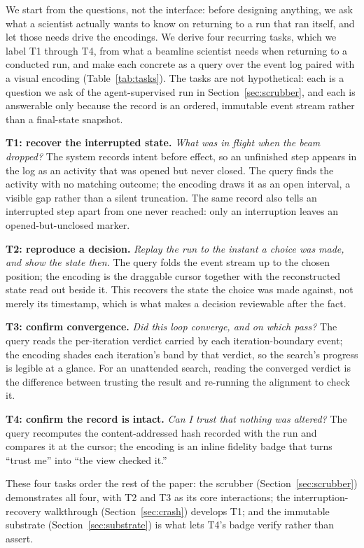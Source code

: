 
We start from the questions, not the interface: before designing anything, we
ask what a scientist actually wants to know on returning to a run that ran
itself, and let those needs drive the encodings. We derive four recurring tasks,
which we label T1 through T4, from what a beamline scientist needs when returning
to a conducted run, and make each concrete as a query over the event log paired
with a visual encoding (Table~\ref{tab:tasks}). The tasks are
not hypothetical: each is a question we ask of the agent-supervised
run in Section~\ref{sec:scrubber}, and each is answerable only because the record is
an ordered, immutable event stream rather than a final-state snapshot.

\textbf{T1: recover the interrupted state.}
\emph{What was in flight when the beam dropped?} The system records intent
before effect, so an unfinished step appears in the log as an activity that
was opened but never closed. The query finds the activity with no matching
outcome; the encoding draws it as an open interval, a visible gap rather than
a silent truncation. The same record also tells an interrupted step apart from
one never reached: only an interruption leaves an opened-but-unclosed marker.

\textbf{T2: reproduce a decision.}
\emph{Replay the run to the instant a choice was made, and show the state
then.} The query folds the event stream up to the chosen position; the
encoding is the draggable cursor together with the reconstructed state read
out beside it. This recovers the state the choice was made against, not merely
its timestamp, which is what makes a decision reviewable after the fact.

\textbf{T3: confirm convergence.}
\emph{Did this loop converge, and on which pass?} The query reads the
per-iteration verdict carried by each iteration-boundary event; the encoding
shades each iteration's band by that verdict, so the search's progress is legible
at a glance. For an unattended search, reading the converged verdict is the
difference between trusting the result and re-running the alignment to check it.

\textbf{T4: confirm the record is intact.}
\emph{Can I trust that nothing was altered?} The query recomputes the
content-addressed hash recorded with the run and compares it at the cursor;
the encoding is an inline fidelity badge that turns ``trust me'' into ``the
view checked it.''

These four tasks order the rest of the paper: the scrubber
(Section~\ref{sec:scrubber}) demonstrates all four, with T2 and T3 as its core
interactions; the interruption-recovery walkthrough (Section~\ref{sec:crash})
develops T1; and the immutable substrate (Section~\ref{sec:substrate}) is what
lets T4's badge verify rather than assert.

